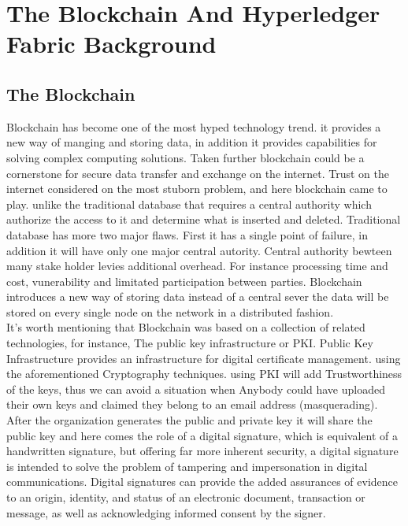 \chapter{The Blockchain And Hyperledger Fabric Background}

\section{The Blockchain} 


 Blockchain has become one of the most hyped technology trend. it provides a new way of manging and storing data, in addition it provides capabilities for solving complex computing solutions. Taken further blockchain could be a cornerstone for secure data transfer and exchange on the internet.
Trust on the internet considered on the most stuborn problem, and here blockchain came to play. unlike the traditional database that requires a central authority which authorize the access to it and determine what is inserted and deleted. Traditional database has more two major flaws. 
First it has a single point of failure, in addition it will have only one major central autority. Central authority bewteen many stake holder levies additional overhead. 
For instance processing time and cost, vunerability and limitated participation between parties.  
Blockchain introduces a new way of storing data instead of a central sever the data will be stored on every single node on the network in a distributed fashion. 
\\

It's worth mentioning that Blockchain was based on a collection of related technologies, for instance, The public key infrastructure or PKI.
Public Key Infrastructure provides an infrastructure for digital certificate management. using the
aforementioned Cryptography techniques. using PKI will add Trustworthiness of the keys, thus we
can avoid a situation when Anybody could have uploaded their own keys and claimed they belong
to an email address (masquerading). After the organization generates the public and private key
it will share the public key and here comes the role of a digital signature, which is equivalent of
a handwritten signature, but offering far more inherent security, a digital signature is intended to
solve the problem of tampering and impersonation in digital communications. Digital signatures can
provide the added assurances of evidence to an origin, identity, and status of an electronic document,
transaction or message, as well as acknowledging informed consent by the signer. \\


